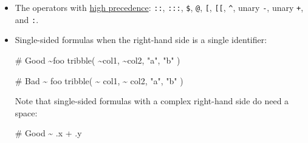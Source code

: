 \documentclass[twoside, pagesize, fontsize=11pt, dvipsnames]{scrreport} %
\newenvironment{Shaded}{\begin{snugshade}}{\end{snugshade}}
\newcommand{\CommentTok}[1]{\textcolor[rgb]{0.37,0.37,0.37}{#1}}
\newcommand{\DecValTok}[1]{\textcolor[rgb]{0.68,0.00,0.00}{#1}}
\newcommand{\FunctionTok}[1]{\textcolor[rgb]{0.28,0.35,0.67}{#1}}
\newcommand{\NormalTok}[1]{\textcolor[rgb]{0.00,0.23,0.31}{#1}}
\newcommand{\OtherTok}[1]{\textcolor[rgb]{0.00,0.23,0.31}{#1}}
\newcommand{\SpecialCharTok}[1]{\textcolor[rgb]{0.37,0.37,0.37}{#1}}
\newcommand{\StringTok}[1]{\textcolor[rgb]{0.13,0.47,0.30}{#1}}
\begin{document}
\begin{itemize}
\item
  The operators with \href{https://rdrr.io/r/base/Syntax.html}{high
  precedence}: \texttt{::}, \texttt{:::}, \texttt{\$}, \texttt{@},
  \texttt{{[}}, \texttt{{[}{[}}, \texttt{\^{}}, unary \texttt{-}, unary
  \texttt{+}, and \texttt{:}.

\begin{Shaded}
\end{Shaded}
\item
  Single-sided formulas when the right-hand side is a single identifier:

\begin{Shaded}
\begin{Highlighting}[]
\CommentTok{\# Good}
\SpecialCharTok{\textasciitilde{}}\NormalTok{foo}
\FunctionTok{tribble}\NormalTok{(}
  \SpecialCharTok{\textasciitilde{}}\NormalTok{col1, }\SpecialCharTok{\textasciitilde{}}\NormalTok{col2,}
  \StringTok{"a"}\NormalTok{,   }\StringTok{"b"}
\NormalTok{)}

\CommentTok{\# Bad}
\SpecialCharTok{\textasciitilde{}}\NormalTok{ foo}
\FunctionTok{tribble}\NormalTok{(}
  \SpecialCharTok{\textasciitilde{}}\NormalTok{ col1, }\SpecialCharTok{\textasciitilde{}}\NormalTok{ col2,}
  \StringTok{"a"}\NormalTok{, }\StringTok{"b"}
\NormalTok{)}
\end{Highlighting}
\end{Shaded}

  Note that single-sided formulas with a complex right-hand side do need
  a space:

\begin{Shaded}
\begin{Highlighting}[]
\CommentTok{\# Good}
\SpecialCharTok{\textasciitilde{}}\NormalTok{ .x }\SpecialCharTok{+}\NormalTok{ .y}


\end{Highlighting}
\end{Shaded}
\end{itemize}
\end{document}
